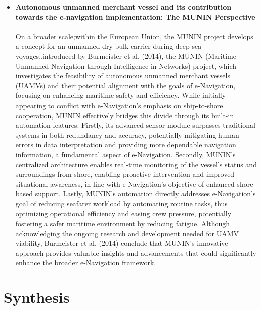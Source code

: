 \begin{itemize}
  \item {\bf Autonomous unmanned merchant vessel and its contribution towards the e-navigation implementation: The MUNIN Perspective}
  \paragraph{} On a broader scale;within the European Union, the MUNIN project develops a concept for an unmanned dry bulk carrier 
              during deep-sea voyages..introduced by Burmeister et al. (2014), the MUNIN (Maritime Unmanned Navigation through 
              Intelligence in Networks)  project, which investigates the feasibility of autonomous unmanned merchant vessels (UAMVs) 
              and their potential alignment with the goals of e-Navigation, focusing on enhancing maritime safety and efficiency. 
              While initially appearing to conflict with e-Navigation's emphasis on ship-to-shore cooperation, MUNIN effectively 
              bridges this divide through its built-in automation features. Firstly, its advanced sensor module surpasses traditional 
              systems in both redundancy and accuracy, potentially mitigating human errors in data interpretation and providing more 
              dependable navigation information, a fundamental aspect of e-Navigation. Secondly, MUNIN's centralized architecture 
              enables real-time monitoring of the vessel's status and surroundings from shore, enabling proactive intervention and 
              improved situational awareness, in line with e-Navigation's objective of enhanced shore-based support. Lastly, MUNIN's 
              automation directly addresses e-Navigation's goal of reducing seafarer workload by automating routine tasks, thus 
              optimizing operational efficiency and easing crew pressure, potentially fostering a safer maritime environment by 
              reducing fatigue. Although acknowledging the ongoing research and development needed for UAMV viability, Burmeister 
              et al. (2014) conclude that MUNIN's innovative approach provides valuable insights and advancements that could 
              significantly enhance the broader e-Navigation framework.
\end{itemize}

\section{Synthesis}
